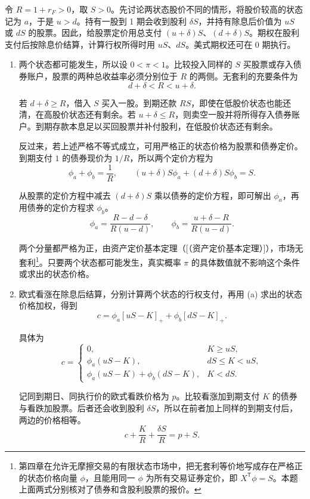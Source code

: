 \begin{solution}[blank-type=manual,blank-vsep=9\baselineskip]

令 $R=1+r_F>0$，取 $S>0$。先讨论两状态股价不同的情形，将股价较高的状态记为 $a$，于是 $u>d$。持有一股到 1 期会收到股利 $\delta S$，并持有除息后价值为 $uS$ 或 $dS$ 的股票。因此，给股票定价用总支付 $(u+\delta)S$、$(d+\delta)S$。期权在股利支付后按除息价结算，计算行权所得时用 $uS$、$dS$。美式期权还可在 0 期执行。
\begin{enumerate}[label=(\alph*)]
 \item 两个状态都可能发生，所以设 $0<\pi<1$。比较投入同样的 $S$ 买股票或存入债券账户，股票的两种总收益率必须分别位于 $R$ 的两侧。无套利的充要条件为
 \[
 d+\delta<R<u+\delta.
 \]

 若 $d+\delta\ge R$，借入 $S$ 买入一股。到期还款 $RS$，即使在低股价状态也能还清，在高股价状态还有剩余。若 $u+\delta\le R$，则卖空一股并将所得存入债券账户。到期存款本息足以买回股票并补付股利，在低股价状态还有剩余。

 反过来，若上述严格不等式成立，可用严格正的状态价格为股票和债券定价。到期支付 $1$ 的债券现价为 $1/R$，所以两个定价方程为
 \[
 \phi_a+\phi_b=\frac1R,\qquad
 (u+\delta)S\phi_a+(d+\delta)S\phi_b=S.
 \]

 从股票的定价方程中减去 $(d+\delta)S$ 乘以债券的定价方程，即可解出 $\phi_a$，再用债券的定价方程求 $\phi_b$。
 \[
 \phi_a=\frac{R-d-\delta}{R(u-d)},\qquad
 \phi_b=\frac{u+\delta-R}{R(u-d)}.
 \]

 两个分量都严格为正，由资产定价基本定理\ifdefined\WJHandoutKnowledge（[（资产定价基本定理）]）\fi，市场无套利\footnote{第四章在允许无摩擦交易的有限状态市场中，把无套利等价地写成存在严格正的状态价格向量 $\phi$，且能用同一 $\phi$ 为所有交易证券定价，即 $X^{\mathsf T}\phi=S$。本题上面两式分别核对了债券和含股利股票的报价。}。只要两个状态都可能发生，真实概率 $\pi$ 的具体数值就不影响这个条件或求出的状态价格。

 \item 欧式看涨在除息后结算，分别计算两个状态的行权支付，再用 (a) 求出的状态价格加权，得到
 \[
 c=\phi_a[uS-K]_++\phi_b[dS-K]_+.
 \]

 具体为
 \[
 c=\begin{cases}
 0,&K\ge uS,\\
 \phi_a(uS-K),&dS\le K<uS,\\
 \phi_a(uS-K)+\phi_b(dS-K),&K<dS.
 \end{cases}
 \]

 记同到期日、同执行价的欧式看跌价格为 $p$。比较看涨加到期支付 $K$ 的债券与看跌加股票。后者还会收到股利 $\delta S$，所以在前者加上同样的到期支付后，两边的价格相等。
 \[
 c+\frac K R+\frac{\delta S}R=p+S.
 \]


\end{enumerate}
\end{solution}
